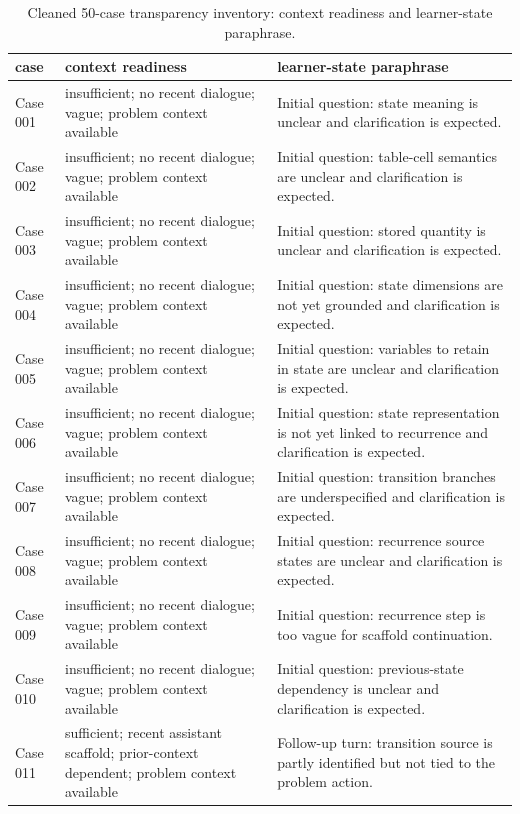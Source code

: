 \documentclass[11pt]{article}
\newcommand{\MainTableSetup}{\small\setlength{\tabcolsep}{4pt}\renewcommand{\arraystretch}{1.16}}
\begin{document}
\begin{landscape}
\begingroup
\MainTableSetup
\begin{xltabular}{\textwidth}{>{\raggedright\arraybackslash}p{0.08\textwidth}>{\raggedright\arraybackslash}p{0.34\textwidth}>{\raggedright\arraybackslash}X}
\caption{Cleaned 50-case transparency inventory: context readiness and learner-state paraphrase.}\label{tab:case-inventory-context}\\
\toprule
case & context readiness & learner-state paraphrase \\
\midrule
Case 001 & insufficient; no recent dialogue; vague; problem context available & Initial question: state meaning is unclear and clarification is expected. \\
Case 002 & insufficient; no recent dialogue; vague; problem context available & Initial question: table-cell semantics are unclear and clarification is expected. \\
Case 003 & insufficient; no recent dialogue; vague; problem context available & Initial question: stored quantity is unclear and clarification is expected. \\
Case 004 & insufficient; no recent dialogue; vague; problem context available & Initial question: state dimensions are not yet grounded and clarification is expected. \\
Case 005 & insufficient; no recent dialogue; vague; problem context available & Initial question: variables to retain in state are unclear and clarification is expected. \\
Case 006 & insufficient; no recent dialogue; vague; problem context available & Initial question: state representation is not yet linked to recurrence and clarification is expected. \\
Case 007 & insufficient; no recent dialogue; vague; problem context available & Initial question: transition branches are underspecified and clarification is expected. \\
Case 008 & insufficient; no recent dialogue; vague; problem context available & Initial question: recurrence source states are unclear and clarification is expected. \\
Case 009 & insufficient; no recent dialogue; vague; problem context available & Initial question: recurrence step is too vague for scaffold continuation. \\
Case 010 & insufficient; no recent dialogue; vague; problem context available & Initial question: previous-state dependency is unclear and clarification is expected. \\
Case 011 & sufficient; recent assistant scaffold; prior-context dependent; problem context available & Follow-up turn: transition source is partly identified but not tied to the problem action. \\

\end{xltabular}
\end{landscape}
\end{document}
